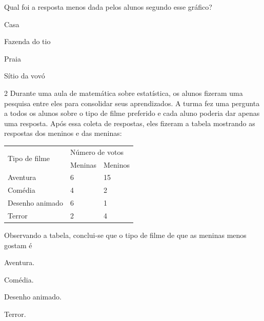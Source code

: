 Qual foi a resposta menos dada pelos alunos segundo esse gráfico?

\begin{minipage}{.5\textwidth}
\begin{escolha}
\item
  Casa
\item
  Fazenda do tio
\item
  Praia
\item
  Sítio da vovó
\end{escolha}
\end{minipage}

\num{2} Durante uma aula de matemática sobre estatística, os alunos fizeram uma
pesquisa entre eles para consolidar seus aprendizados. A turma fez uma
pergunta a todos os alunos sobre o tipo de filme preferido e cada aluno
poderia dar apenas uma resposta. Após essa coleta de respostas, eles
fizeram a tabela mostrando as respostas dos meninos e das
meninas:

\begin{center}
\begin{tabular}{l|ll}
\hline
\multirow{2}{*}{Tipo de filme} & \multicolumn{2}{l}{Número de votos} \\ \cline{2-3} 
 & \multicolumn{1}{l|}{Meninas} & Meninos \\ \hline
Aventura & \multicolumn{1}{l|}{6} & 15 \\ \hline
Comédia & \multicolumn{1}{l|}{4} & 2 \\ \hline
Desenho animado & \multicolumn{1}{l|}{6} & 1 \\ \hline
Terror & \multicolumn{1}{l|}{2} & 4 \\ \hline
\end{tabular}
\end{center}

Observando a tabela, conclui-se que o tipo de filme de que as meninas menos
gostam é

\begin{minipage}{.5\textwidth}
\begin{escolha}

\item
  Aventura.
\item
  Comédia.
\item
  Desenho animado.
\item
  Terror.
\end{escolha}
\end{minipage}

